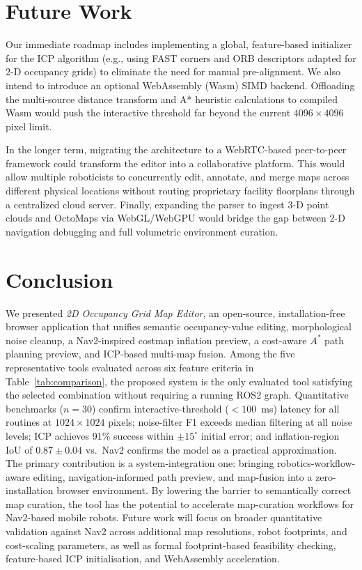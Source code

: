 \documentclass{IEEE_lsens}
\begin{document}
\section{Future Work}
\label{sec:future_work}
Our immediate roadmap includes implementing a global, feature-based initializer for the ICP algorithm (e.g., using FAST corners and ORB descriptors adapted for 2-D occupancy grids) to eliminate the need for manual pre-alignment. We also intend to introduce an optional WebAssembly (Wasm) SIMD backend. Offloading the multi-source distance transform and A* heuristic calculations to compiled Wasm would push the interactive threshold far beyond the current $4096\times4096$ pixel limit.

In the longer term, migrating the architecture to a WebRTC-based peer-to-peer framework could transform the editor into a collaborative platform. This would allow multiple roboticists to concurrently edit, annotate, and merge maps across different physical locations without routing proprietary facility floorplans through a centralized cloud server. Finally, expanding the parser to ingest 3-D point clouds and OctoMaps via WebGL/WebGPU would bridge the gap between 2-D navigation debugging and full volumetric environment curation.

\section{Conclusion}
We presented \emph{2D Occupancy Grid Map Editor}, an open-source, installation-free browser application that unifies semantic occupancy-value editing, morphological noise cleanup, a Nav2-inspired costmap inflation preview, a cost-aware $A^{*}$ path planning preview, and ICP-based multi-map fusion. Among the five representative tools evaluated across six feature criteria in Table~\ref{tab:comparison}, the proposed system is the only evaluated tool satisfying the selected combination without requiring a running ROS2 graph. Quantitative benchmarks ($n=30$) confirm interactive-threshold ($<\!100$~ms) latency for all routines at $1024\times1024$ pixels; noise-filter F1 exceeds median filtering at all noise levels; ICP achieves 91\% success within $\pm15^\circ$ initial error; and inflation-region IoU of $0.87\pm0.04$ vs.\ Nav2 confirms the model as a practical approximation. The primary contribution is a system-integration one: bringing robotics-workflow-aware editing, navigation-informed path preview, and map-fusion into a zero-installation browser environment. By lowering the barrier to semantically correct map curation, the tool has the potential to accelerate map-curation workflows for Nav2-based mobile robots. Future work will focus on broader quantitative validation against Nav2 across additional map resolutions, robot footprints, and cost-scaling parameters, as well as formal footprint-based feasibility checking, feature-based ICP initialisation, and WebAssembly acceleration.
\end{document}
